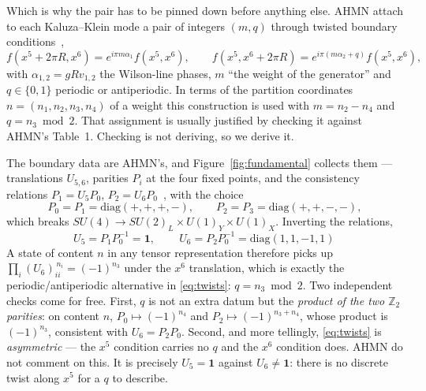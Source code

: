 \documentclass[11pt,a4paper]{article}
\newcommand{\ZZ}{\mathbb{Z}}
\begin{document}
Which is why the pair has to be pinned down before anything else. AHMN
attach to each Kaluza--Klein mode a pair of integers $(m,q)$ through twisted boundary
conditions~\cite[Eqs.~(3.3)--(3.4)]{AHMN},
\begin{equation}\label{eq:twists}
f(x^5+2\pi R,x^6)=e^{i\pi m\alpha_1}f(x^5,x^6),\qquad
f(x^5,x^6+2\pi R)=e^{i\pi(m\alpha_2+q)}f(x^5,x^6),
\end{equation}
with $\alpha_{1,2}=gRv_{1,2}$ the Wilson-line phases, $m$ ``the weight of the generator'' and
$q\in\{0,1\}$ periodic or antiperiodic. In terms of the partition coordinates
$n=(n_1,n_2,n_3,n_4)$ of a weight this construction is used with $m=n_2-n_4$ and
$q=n_3\bmod2$. That assignment is usually justified by checking it against AHMN's Table~1.
Checking is not deriving, so we derive it.

The boundary data are AHMN's, and Figure~\ref{fig:fundamental} collects them --- translations
$U_{5,6}$, parities $P_i$ at the four fixed
points, and the consistency relations $P_1=U_5P_0$, $P_2=U_6P_0$~\cite[Eq.~(2.8)]{AHMN},
with the choice~\cite[Eqs.~(2.9)--(2.10)]{AHMN}
\[
P_0=P_1=\mathrm{diag}(+,+,+,-),\qquad P_2=P_3=\mathrm{diag}(+,+,-,-),
\]
which breaks $SU(4)\to SU(2)_L\times U(1)_Y\times U(1)_X$. Inverting the relations,
\begin{equation}\label{eq:U}
U_5=P_1P_0^{-1}=\mathbf{1},\qquad
\boxed{\,U_6=P_2P_0^{-1}=\mathrm{diag}(1,1,-1,1)\,}
\end{equation}
A state of content $n$ in any tensor representation therefore picks up
$\prod_i (U_6)_{ii}^{\,n_i}=(-1)^{n_3}$ under the $x^6$ translation, which is exactly the
periodic/antiperiodic alternative in \eqref{eq:twists}: $q=n_3\bmod2$. Two independent
checks come for free. First, $q$ is not an extra datum but the \emph{product of the two
$\ZZ_2$ parities}: on content $n$, $P_0\mapsto(-1)^{n_4}$ and $P_2\mapsto(-1)^{n_3+n_4}$,
whose product is $(-1)^{n_3}$, consistent with $U_6=P_2P_0$. Second, and more tellingly,
\eqref{eq:twists} is \emph{asymmetric} --- the $x^5$ condition carries no $q$ and the $x^6$
condition does. AHMN do not comment on this. It is precisely $U_5=\mathbf{1}$ against
$U_6\neq\mathbf{1}$: there is no discrete twist along $x^5$ for a $q$ to describe.
\end{document}
